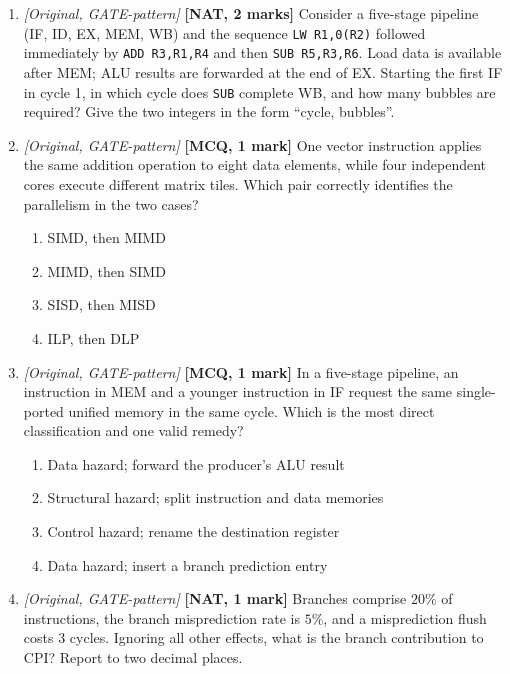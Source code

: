 \documentclass[11pt]{article}
\begin{document}
\begin{enumerate}
\item[\textbf{Q4}] \textit{[Original, GATE-pattern]} \textbf{[NAT, 2 marks]}
Consider a five-stage pipeline (IF, ID, EX, MEM, WB) and the sequence
\texttt{LW R1,0(R2)} followed immediately by \texttt{ADD R3,R1,R4} and then
\texttt{SUB R5,R3,R6}. Load data is available after MEM; ALU results are
forwarded at the end of EX. Starting the first IF in cycle 1, in which cycle
does \texttt{SUB} complete WB, and how many bubbles are required?
Give the two integers in the form ``cycle, bubbles''.

\item[\textbf{Q5}] \textit{[Original, GATE-pattern]} \textbf{[MCQ, 1 mark]}
One vector instruction applies the same addition operation to eight data
elements, while four independent cores execute different matrix tiles. Which
pair correctly identifies the parallelism in the two cases?
\begin{enumerate}
  \item[(A)] SIMD, then MIMD
  \item[(B)] MIMD, then SIMD
  \item[(C)] SISD, then MISD
  \item[(D)] ILP, then DLP
\end{enumerate}

\item[\textbf{Q6}] \textit{[Original, GATE-pattern]} \textbf{[MCQ, 1 mark]}
In a five-stage pipeline, an instruction in MEM and a younger instruction in
IF request the same single-ported unified memory in the same cycle. Which is
the most direct classification and one valid remedy?
\begin{enumerate}
  \item[(A)] Data hazard; forward the producer's ALU result
  \item[(B)] Structural hazard; split instruction and data memories
  \item[(C)] Control hazard; rename the destination register
  \item[(D)] Data hazard; insert a branch prediction entry
\end{enumerate}

\item[\textbf{Q7}] \textit{[Original, GATE-pattern]} \textbf{[NAT, 1 mark]}
Branches comprise $20\%$ of instructions, the branch misprediction rate is
$5\%$, and a misprediction flush costs 3 cycles. Ignoring all other effects,
what is the branch contribution to CPI? Report to two decimal places.


\end{enumerate}
\end{document}
